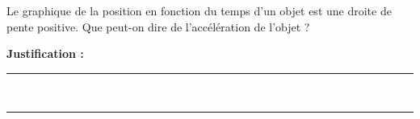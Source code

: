 Le graphique de la position en fonction du temps d'un objet est une droite de pente positive. Que peut-on dire de l'accélération de l'objet ?

\choices

\noindent\textbf{Justification :} \hrulefill \\[2.5ex]
\rule{\linewidth}{0.4pt} \\[2.5ex]
\rule{\linewidth}{0.4pt}
\vfill
